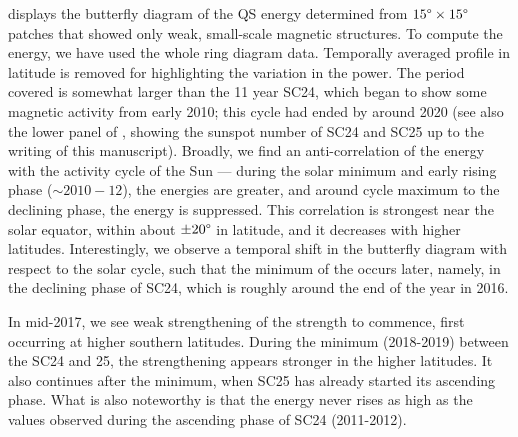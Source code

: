 \documentclass{aa}
\begin{document}


 displays the butterfly diagram of the QS
\fff energy determined
from $15\degree \times 15\degree$ patches that showed only weak, small-scale magnetic structures.
To compute the \fff
energy, we have used the whole ring diagram data.
Temporally averaged profile in latitude is removed for highlighting the variation in the
\fff power. The period covered is somewhat larger than the 11 year 
SC24,
which
began to show some magnetic activity from early 2010; this cycle had ended by around 2020 (see also the lower panel of , 
showing the sunspot number of SC24 and SC25 up to the writing of this manuscript).
Broadly, we find an anti-correlation of the \fff 
energy with the activity cycle of the
Sun --- during the solar minimum and early rising phase ($\sim 2010-12$), the \fff
energies
are greater, and around cycle maximum to the declining phase,
the \fff
energy 
is suppressed.
This correlation is strongest near the solar equator, within about $\pm 20\degree$ in
latitude, and it decreases with higher latitudes.
Interestingly, we observe a temporal shift in the \fff butterfly diagram with respect to the
solar cycle, such that the minimum of the \fff occurs later, namely, in the declining phase of
SC24, which is roughly around the end of the year in 2016.

In mid-2017, we see weak strengthening of the \fff strength to commence, first occurring at higher southern latitudes. During the minimum (2018-2019) between the SC24 and 25, the strengthening appears stronger in the higher latitudes. It also continues after the minimum, when 
SC25
has already started its ascending phase. What is also noteworthy is that the \fff
energy
never rises as high as the values observed during the ascending phase of SC24 (2011-2012).
\end{document}
